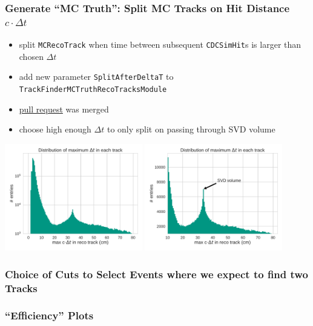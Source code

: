 \documentclass[18pt]{beamer}
\begin{document}
\begin{frame}
  \frametitle{Generate ``MC Truth'': Split MC Tracks on Hit Distance $c \cdot \Delta t$}
  \begin{itemize}
  \item split \texttt{MCRecoTrack} when time between subsequent \texttt{CDCSimHit}s is larger than chosen $\Delta t$
  \item add new parameter \texttt{SplitAfterDeltaT} to \texttt{TrackFinderMCTruthRecoTracksModule}
  \item \href{https://stash.desy.de/projects/B2/repos/software/pull-requests/737}{pull request} was merged
  \item choose high enough $\Delta t$ to only split on passing through SVD volume
  \end{itemize}
  \begin{center}
    \includegraphics[width=0.45\textwidth]{figures/delta_t/delta_t_max_log.pdf}
    \includegraphics[width=0.45\textwidth]{figures/delta_t/delta_t_max_linear_annotated.pdf}
  \end{center}
\end{frame}

\begin{frame}
  \frametitle{Choice of Cuts to Select Events where we expect to find two Tracks}
  
\end{frame}

\begin{frame}
  \frametitle{``Efficiency'' Plots}
  
\end{frame}
\end{document}
